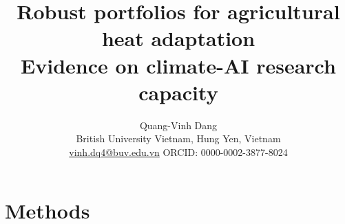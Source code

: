 \documentclass[11pt]{article}
\title{Robust portfolios for agricultural heat adaptation\\
Evidence on climate-AI research capacity}
\author{}
\author{Quang-Vinh Dang\\
\small British University Vietnam, Hung Yen, Vietnam\\
\small \href{mailto:vinh.dq4@buv.edu.vn}{vinh.dq4@buv.edu.vn} \quad ORCID: 0000-0002-3877-8024}
\date{}
\begin{document}
\maketitle






\section{Methods}














\clearpage
\appendix

\end{document}
